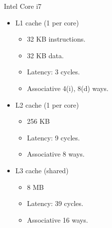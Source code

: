 \begin{frame}[t]{Intel Core i7}
\begin{itemize}
  \item L1 cache (1 per core)
    \begin{itemize}
      \item 32 KB instructions.
      \item 32 KB data.
      \item Latency: 3 cycles. 
      \item Associative 4(i), 8(d) ways. 
    \end{itemize}

  \item L2 cache (1 per core)
    \begin{itemize}
      \item 256 KB
      \item Latency: 9 cycles.
      \item Associative 8 ways.
    \end{itemize}

  \item L3 cache (shared)
    \begin{itemize}
      \item 8 MB
      \item Latency: 39 cycles.
      \item Associative 16 ways.
    \end{itemize}
\end{itemize}
\end{frame}
